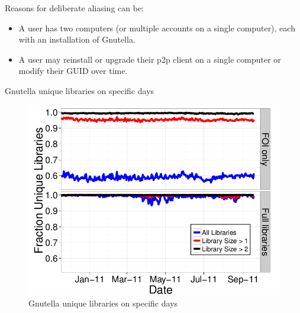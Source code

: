 \documentclass[notes]{beamer}
\begin{document}
\begin{frame}

\begin{block}{Reasons for deliberate aliasing can be:}

\begin{itemize}

\item[\checkmark]A user has two computers (or multiple
accounts on a single computer), each with an installation
of Gnutella.

\item[\checkmark]A user may reinstall or upgrade their p2p client on a single computer or modify their GUID over time.

\end{itemize}

\end{block}

\end{frame}

\begin{frame}

\begin{block}{Gnutella unique libraries on specific days}

\begin{figure}[!htb]
\centering
\includegraphics[scale=0.3]{Libraries_specific_day}
\caption{Gnutella unique libraries on specific days}
\label{fig:Libraries_specific_day}
\end{figure}

\end{block}

\end{frame}
\end{document}
